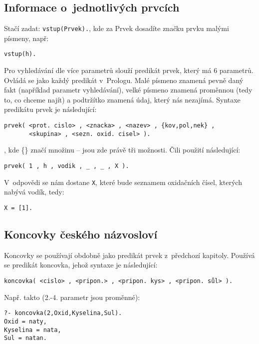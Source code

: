 \documentclass[a4paper]{article}
\begin{document}
\subsection{Informace o~jednotlivých prvcích}
Stačí zadat: \texttt{vstup(Prvek).}, kde za Prvek dosadíte značku prvku malými písmeny, např:
\begin{verbatim}
vstup(h).
\end{verbatim}
Pro vyhledávání dle více parametrů slouží predikát prvek, který má 6 parametrů. Ovládá se jako každý predikát v~Prologu. Malé písmeno znamená pevně daný fakt (například parametr vyhledávání), velké písmeno znamená proměnnou (tedy to, co chceme najít) a podtržítko znamená údaj, který nás nezajímá. Syntaxe predikátu prvek je následující:
\begin{verbatim}
prvek( <prot. cislo> , <znacka> , <nazev> , {kov,pol,nek} , 
	   <skupina> , <sezn. oxid. cisel> ). 
\end{verbatim}
, kde \{\} značí množinu -- jsou zde právě tři možnosti. Čili použití následující:
\begin{verbatim}
prvek( 1 , h , vodik , _ , _ , X ).
\end{verbatim}
V~odpovědi se nám dostane \texttt{X}, které bude seznamem oxidačních čísel, kterých nabývá vodík, tedy:
\begin{verbatim}
X = [1].
\end{verbatim}

\subsection{Koncovky českého názvosloví}
Koncovky se používají obdobně jako predikát prvek z~předchozí kapitoly. Používá se predikát koncovka, jehož syntaxe je následující:
\begin{verbatim}
koncovka( <cislo> , <pripon.> , <pripon. kys> , <pripon. sůl> ).
\end{verbatim}
Např. takto (2.-4. parametr jsou proměnné):
\begin{verbatim}
?- koncovka(2,Oxid,Kyselina,Sul).
Oxid = naty,
Kyselina = nata,
Sul = natan.
\end{verbatim}
\end{document}
